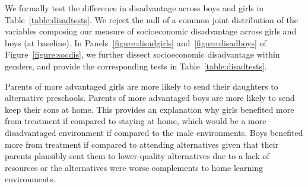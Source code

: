 We formally test the difference in disadvantage across boys and girls in Table~\ref{table:disadtests}. We reject the null of a common joint distribution of the variables composing our measure of socioeconomic disadvantage across girls and boys (at baseline). In Panels~\ref{figure:disadgirls} and~\ref{figure:disadboys} of Figure~\ref{figure:socdis}, we further dissect socioeconomic disadvantage within genders, and provide the corresponding tests in Table~\ref{table:disadtests}. 


Parents of more advantaged girls are more likely to send their daughters to alternative preschools. Parents of more advantaged boys are more likely to send keep their sons at home. This provides an explanation why girls benefited more from treatment if compared to staying at home, which would be a more disadvantaged environment if compared to the male environments. Boys benefited more from treatment if compared to attending alternatives given that their parents plausibly sent them to lower-quality alternatives due to a lack of resources or the alternatives were worse complements to home learning environments. 











